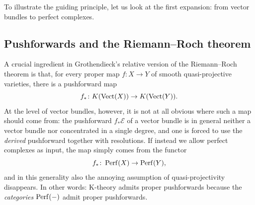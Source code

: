 	To illustrate the guiding principle, let us look at the first expansion: from vector bundles to perfect complexes.

	\subsection*{Pushforwards and the Riemann--Roch theorem}
	A crucial ingredient in Grothendieck's relative version of the Riemann--Roch theorem \cite{Borel_Serre_Riemann_Roch} is that, for every proper map $f\colon X \to Y$ of smooth quasi-projective varieties, there is a pushforward map
	\[
		f_*\colon K({\textup{Vect}}(X)) \to K({\textup{Vect}}(Y)).
	\]
	At the level of vector bundles, however, it is not at all obvious where such a map should come from: the pushforward $f_*\mathcal{E}$ of a vector bundle is in general neither a vector bundle nor concentrated in a single degree, and one is forced to use the \emph{derived} pushforward together with resolutions. If instead we allow perfect complexes as input, the map simply comes from the functor
	\[
		f_*\colon \operatorname{Perf}(X) \to \operatorname{Perf}(Y),
	\]
	and in this generality also the annoying assumption of quasi-projectivity disappears. In other words: K-theory admits proper pushforwards because the \emph{categories} $\operatorname{Perf}(-)$ admit proper pushforwards.

